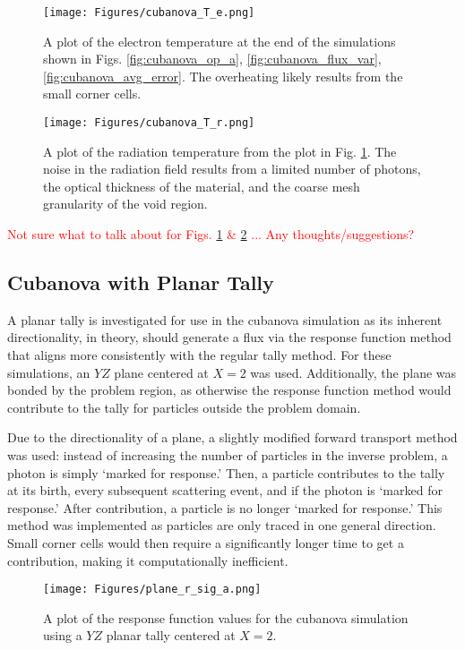 \begin{chapabstract}
\begin{figure} [h!]
	\centering
	\texttt{[image: Figures/cubanova\_T\_e.png]}
	\caption{A plot of the electron temperature at the end of the simulations shown in Figs. \ref{fig:cubanova_op_a}, \ref{fig:cubanova_flux_var}, \ref{fig:cubanova_avg_error}. The overheating likely results from the small corner cells.}
	\label{fig:cubanova_T_e}
\end{figure}

\begin{figure} [h!]
	\centering
	\texttt{[image: Figures/cubanova\_T\_r.png]}
	\caption{A plot of the radiation temperature from the plot in Fig. \ref{fig:cubanova_T_e}. The noise in the radiation field results from a limited number of photons, the optical thickness of the material, and the coarse mesh granularity of the void region.}
	\label{fig:cubanova_T_r}
\end{figure}

\textcolor{red}{Not sure what to talk about for Figs. \ref{fig:cubanova_T_e} \& \ref{fig:cubanova_T_r} ... Any thoughts/suggestions? }

\subsection{Cubanova with Planar Tally} \label{Sec: plane_tally}		
A planar tally is investigated for use in the cubanova simulation as its inherent directionality, in theory, should generate a flux via the response function method that aligns more consistently with the regular tally method. For these simulations, an $YZ$ plane centered at $X = 2$ was used. Additionally, the plane was bonded by the problem region, as otherwise the response function method would contribute to the tally for particles outside the problem domain. 

Due to the directionality of a plane, a slightly modified forward transport method was used: instead of increasing the number of particles in the inverse problem, a photon is simply `marked for response.' Then, a particle contributes to the tally at its birth, every subsequent scattering event, and if the photon is `marked for response.' After contribution, a particle is no longer `marked for response.' This method was implemented as particles are only traced in one general direction. Small corner cells would then require a significantly longer time to get a contribution, making it computationally inefficient.

\begin{figure} [h!]
	\centering
	\texttt{[image: Figures/plane\_r\_sig\_a.png]}
	\caption{A plot of the response function values for the cubanova simulation using a $YZ$ planar tally centered at $X=2$. }
	\label{fig:plane_r_sig_a}
\end{figure}


\end{chapabstract}
